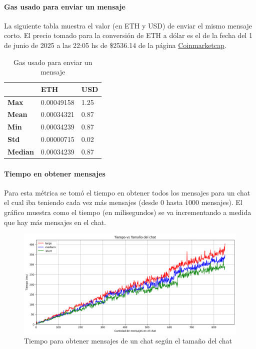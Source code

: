 \paragraph{Gas usado para enviar un mensaje}

La siguiente tabla muestra el valor (en ETH y USD) de enviar el mismo mensaje corto. El precio tomado para la conversión de ETH a dólar es el de la fecha del 1 de junio de 2025 a las 22:05 hs de \$2536.14 de la página \href{https://coinmarketcap.com/currencies/ethereum/}{Coinmarketcap}.

\setlength\tabcolsep{1pt}
\begin{table}[!htbp]
    \centering
    \begin{tabular}{|m{5em}|m{6em}|m{3em}|}
    \hline
    & ETH & USD \\
    \hline
    \textbf{Max} & 0.00049158 & 1.25 \\
    \hline
    \textbf{Mean} & 0.00034321 & 0.87 \\
    \hline
    \textbf{Min} & 0.00034239 & 0.87 \\
    \hline
    \textbf{Std} & 0.00000715 & 0.02 \\
    \hline
    \textbf{Median} & 0.00034239 & 0.87 \\
    \hline
    \end{tabular}
    \caption{Gas usado para enviar un mensaje}
\end{table}

\paragraph{Tiempo en obtener mensajes}

Para esta métrica se tomó el tiempo en obtener todos los mensajes para un chat el cual iba teniendo cada vez más mensajes (desde 0 hasta 1000 mensajes). El gráfico muestra como el tiempo (en milisegundos) se va incrementando a medida que hay más mensajes en el chat.

\begin{figure}[h!]
    \centering
    \includegraphics[width=1\linewidth]{img/blockchain-get-message-graphic.png}
    \caption{Tiempo para obtener mensajes de un chat según el tamaño del chat}
    \label{fig:blockchain-get-message-graphic.png}
\end{figure}

